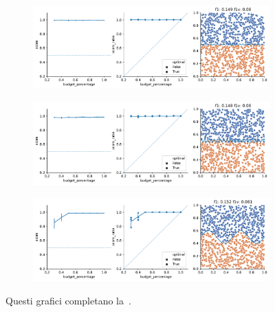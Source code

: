 \begin{appendices}
\begin{figure}[!ht]
\begin{subfigure}{.5\textwidth}
    \end{subfigure}%
    \begin{subfigure}{.5\textwidth}
        \centering
        \includegraphics[width=\textwidth]{img/2d/6.pdf}
    \end{subfigure}%
    \hfill
    \begin{subfigure}{.5\textwidth}
        \centering
        \includegraphics[width=\textwidth]{img/2d/7.pdf}
    \end{subfigure}%
    \begin{subfigure}{.5\textwidth}
        \centering
        \includegraphics[width=\textwidth]{img/2d/11.pdf}
    \end{subfigure}%
    \caption{Questi grafici completano la~.}
\end{figure}


\end{appendices}
